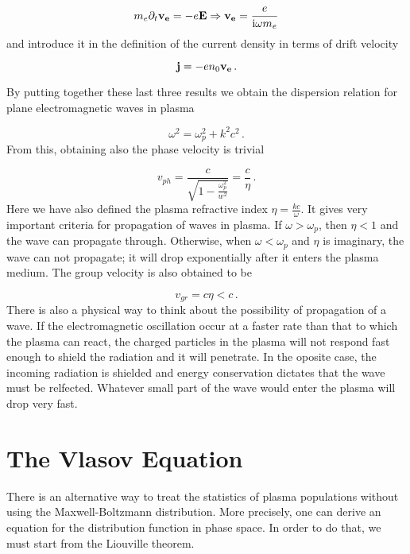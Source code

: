 \documentclass[12pt, class=report, crop=false]{standalone}
\begin{document}
\begin{equation}
  m_e \partial_t \vb{v_e} = - e \vb{E} \Rightarrow \vb{v_e} = \frac{e}{\mathrm{i} \omega m_e}
\end{equation}
and introduce it in the definition of the current density in terms of drift velocity

\begin{equation}
  \vb{j} = -e n_0 \vb{v_e}\,.
\end{equation}

By putting together these last three results we obtain the dispersion relation for plane electromagnetic waves in plasma

\begin{equation}
  \omega^2= \omega_p^2 +k^2c^2\,.
\end{equation}
From this, obtaining also the phase velocity is trivial

\begin{equation}
  v_{ph} = \frac{c}{\sqrt{1-\frac{\omega_p^2}{w^2}}} = \frac{c}{\eta}\,.
\end{equation}
Here we have also defined the plasma refractive index \(\eta = \frac{kc}{\omega}\). It gives very important criteria for propagation of waves in plasma. If \(\omega >\omega_p\), then \(\eta<1\) and the wave can propagate through. Otherwise, when \(\omega<\omega_p\) and \(\eta\) is imaginary, the wave can not propagate; it will drop exponentially after it enters the plasma medium. The group velocity is also obtained to be

\begin{equation}
  v_{gr} = c\eta < c\,.
\end{equation}
There is also a physical way to think about the possibility of propagation of a wave. If the electromagnetic oscillation occur at a faster rate than that to which the plasma can react, the charged particles in the plasma will not respond fast enough to shield the radiation and it will penetrate. In the oposite case, the incoming radiation is shielded and energy conservation dictates that the wave must be relfected. Whatever small part of the wave would enter the plasma will drop very fast.

\section{The Vlasov Equation}

There is an alternative way to treat the statistics of plasma populations without using the Maxwell-Boltzmann distribution. More precisely, one can derive an equation for the distribution function in phase space. In order to do that, we must start from the Liouville theorem.
\end{document}

